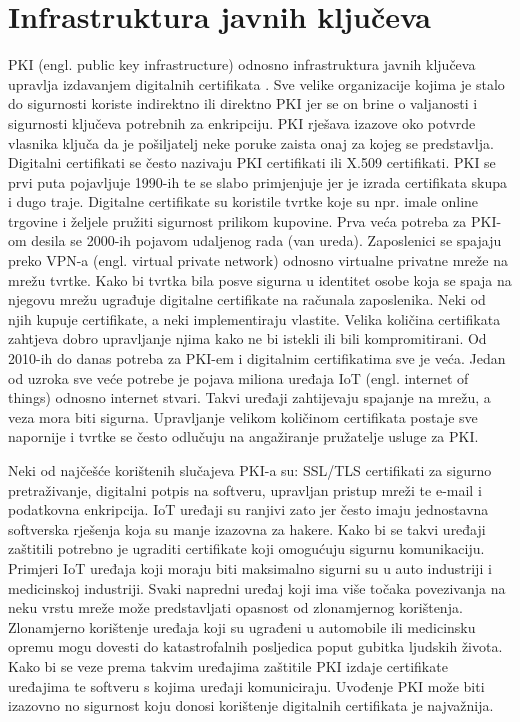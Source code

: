 \documentclass[]{foi}
\begin{document}
\chapter{Infrastruktura javnih ključeva}

PKI (engl. public key infrastructure) odnosno infrastruktura javnih ključeva upravlja izdavanjem digitalnih certifikata
\cite{keyfactor-pki}.
Sve velike organizacije kojima je stalo do sigurnosti koriste indirektno ili direktno PKI jer se on brine o valjanosti i sigurnosti ključeva potrebnih za enkripciju.
PKI rješava izazove oko potvrde vlasnika ključa da je pošiljatelj neke poruke zaista onaj za kojeg se predstavlja.
Digitalni certifikati se često nazivaju PKI certifikati ili X.509 certifikati.
PKI se prvi puta pojavljuje 1990-ih te se slabo primjenjuje jer je izrada certifikata skupa i dugo traje.
Digitalne certifikate su koristile tvrtke koje su npr. imale online trgovine i željele pružiti sigurnost prilikom kupovine.
Prva veća potreba za PKI-om desila se 2000-ih pojavom udaljenog rada (van ureda).
Zaposlenici se spajaju preko VPN-a (engl. virtual private network) odnosno virtualne privatne mreže na mrežu tvrtke.
Kako bi tvrtka bila posve sigurna u identitet osobe koja se spaja na njegovu mrežu ugrađuje digitalne certifikate na računala zaposlenika.
Neki od njih kupuje certifikate, a neki implementiraju vlastite.
Velika količina certifikata zahtjeva dobro upravljanje njima kako ne bi istekli ili bili kompromitirani.
Od 2010-ih do danas potreba za PKI-em i digitalnim certifikatima sve je veća.
Jedan od uzroka sve veće potrebe je pojava miliona uređaja IoT (engl. internet of things) odnosno internet stvari.
Takvi uređaji zahtijevaju spajanje na mrežu, a veza mora biti sigurna.
Upravljanje velikom količinom certifikata postaje sve napornije i tvrtke se često odlučuju na angažiranje pružatelje usluge za PKI.

Neki od najčešće korištenih slučajeva PKI-a su: SSL/TLS certifikati za sigurno pretraživanje, digitalni potpis na softveru, upravljan pristup mreži te e-mail i podatkovna enkripcija.
IoT uređaji su ranjivi zato jer često imaju jednostavna softverska rješenja koja su manje izazovna za hakere.
Kako bi se takvi uređaji zaštitili potrebno je ugraditi certifikate koji omogućuju sigurnu komunikaciju.
Primjeri IoT uređaja koji moraju biti maksimalno sigurni su u auto industriji i medicinskoj industriji.
Svaki napredni uređaj koji ima više točaka povezivanja na neku vrstu mreže može predstavljati opasnost od zlonamjernog korištenja.
Zlonamjerno korištenje uređaja koji su ugrađeni u automobile ili medicinsku opremu mogu dovesti do katastrofalnih posljedica poput gubitka ljudskih života.
Kako bi se veze prema takvim uređajima zaštitile PKI izdaje certifikate uređajima te softveru s kojima uređaji komuniciraju.
Uvođenje PKI može biti izazovno no sigurnost koju donosi korištenje digitalnih certifikata je najvažnija.
\end{document}
